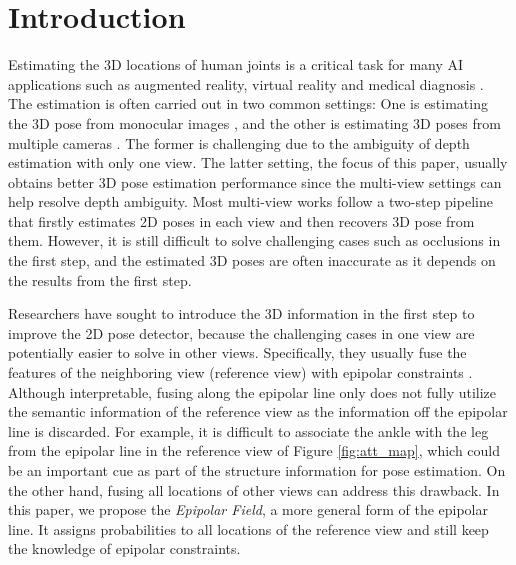 \documentclass{bmvc2k}
\begin{document}
\section{Introduction}
\vspace{-0.7em}
Estimating the 3D locations of human joints is a critical task for many AI applications such as augmented reality, virtual reality and medical diagnosis \cite{chen2021pd}. The estimation is often carried out in two common settings: One is estimating the 3D pose from monocular images \cite{mehta2017vnect, zhang2019end, zimmermann2019freihand, ge20193d, wang2020predicting, chen2020dggan, chen2018generating, tome2017lifting}, and the other is estimating 3D poses from multiple cameras \cite{simon2017hand, wang2019geometric, chen2021mvhm, qiu2019cross, he2020epipolar}. The former is challenging due to the ambiguity of depth estimation with only one view. The latter setting, the focus of this paper, usually obtains better 3D pose estimation performance since the multi-view settings can help resolve depth ambiguity. Most multi-view works follow a two-step pipeline that firstly estimates 2D poses in each view and then recovers 3D pose from them. However, it is still difficult to solve challenging cases such as occlusions in the first step, and the estimated 3D poses are often inaccurate as it depends on the results from the first step. 

Researchers have sought to introduce the 3D information in the first step to improve the 2D pose detector, because the challenging cases in one view are potentially easier to solve in other views. Specifically, they usually fuse the features of the neighboring view (reference view) with epipolar constraints \cite{xie2020metafuse, zhang2021adafuse, he2020epipolar}. 
Although interpretable, fusing along the epipolar line only does not fully utilize the semantic information of the reference view as the information off the epipolar line is discarded. 
For example, it is difficult to associate the ankle with the leg from the epipolar line in the reference view of Figure \ref{fig:att_map}, which could be an important cue as part of the structure information for pose estimation. 
On the other hand, fusing all locations of other views can address this drawback. In this paper, we propose the  \textit{Epipolar Field}, a more general form of the epipolar line. It assigns probabilities to all locations of the reference view and still keep the knowledge of epipolar constraints.
\end{document}
